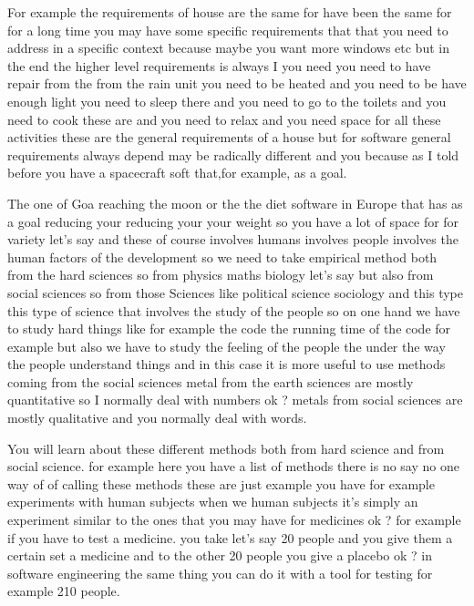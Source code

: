 \documentclass[conference, compsoc, twoside]{IEEEtran}
\begin{document}
For example the requirements of house are the same for have been the same for for a long time you may have some specific requirements that that you need to address in a specific context because maybe you want more windows etc but in the end the higher level requirements is always I you need you need to have repair from the from the rain unit you need to be heated and you need to be have enough light you need to sleep there and you need to go to the toilets and you need to cook these are and you need to relax and you need space for all these activities these are the general requirements of a house but for software general requirements always depend may be radically different and you because as I told before you have a spacecraft soft that,for example, as a goal.

The one of Goa reaching the moon or the the diet software in Europe that has as a goal reducing your reducing your your weight so you have a lot of space for for variety let's say and these of course involves humans involves people involves the human factors of the development so we need to take empirical method both from the hard sciences so from physics maths biology let's say but also from social sciences so from those Sciences like political science sociology and this type this type of science that involves the study of the people so on one hand we have to study hard things like 
for example the code the running time of the code 
for example but also we have to study the feeling of the people the under the way the people understand things and in this case it is more useful to use methods coming from the social sciences metal from the earth sciences are mostly quantitative 
so I normally deal with numbers ok ? metals from social sciences are mostly qualitative and you normally deal with words. 

You will learn about these different methods both from hard science and from social science.
for example here you have a list of methods there is no say no one way of of calling these methods these are just example you have 
for example experiments with human subjects when we human subjects it's simply an experiment similar to the ones that you may have for medicines ok ? 
for example if you have to test a medicine.
you take let's say 20 people and you give them a certain set a medicine and to the other 20 people you give a placebo ok ? in software engineering the same thing you can do it with a tool for testing 
for example 210 people. 
\end{document}

